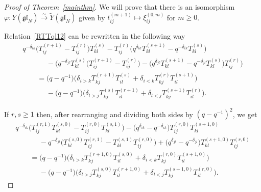\begin{proof}[Proof of Theorem~\ref{mainthm}] We will prove that there is an isomorphism $\varphi\colon Y(\mathfrak{gl}_N)
\stackrel{\sim}{\longrightarrow} \widetilde{Y}(\mathfrak{gl}_N)$ given by $t_{ij}^{(m+1)} \mapsto
\xi_{ij}^{(0,m)}$ for $m\ge 0$.

Relation~\eqref{RTTql12} can be rewritten in the following way
\begin{gather*}
q^{-\delta_{ik}}\big(T_{ij}^{(r+1)} - T_{ij}^{(r)}\big) T_{kl}^{(s)}- T_{ij}^{(r)} \big(q^{\delta_{ik}}T_{kl}^{(s+1)}
- q^{-\delta_{ik}}T_{kl}^{(s)}\big)
\\
\qquad\phantom{=}{}
- \big(q^{-\delta_{jl}}T_{kl}^{(s)} \big(T_{ij}^{(r+1)} - T_{ij}^{(r)}\big) - \big(q^{\delta_{jl}}T_{kl}^{(s+1)} -
q^{-\delta_{jl}}T_{kl}^{(s)}\big) T_{ij}^{(r)} \big)
\\
\qquad
= \big(q-q^{-1}\big) \big(\delta_{i>k}T_{kj}^{(r+1)} T_{il}^{(s)} + \delta_{i<k} T_{kj}^{(r)} T_{il}^{(s+1)}\big)
\\
\qquad\phantom{=}{}
  - \big(q-q^{-1}\big) \big(\delta_{l>j} T_{kj}^{(s)} T_{il}^{(r+1)} + \delta_{l<j} T_{kj}^{(s+1)} T_{il}^{(r)} \big).
\end{gather*}

If $r,s \geq 1$ then, after rearranging and dividing both sides by $(q-q^{-1})^2$, we get
\begin{gather*}
q^{-\delta_{ik}} \big(T_{ij}^{(r,1)} T_{kl}^{(s,0)}- T_{ij}^{(r,0)} T_{kl}^{(s,1)} \big) - \big(q^{\delta_{ik}} -
q^{-\delta_{ik}}\big) T_{ij}^{(r,0)} T_{kl}^{(s+1,0)}
\\
\qquad\phantom{=}{}
 - q^{-\delta_{jl}} \big(T_{kl}^{(s,0)} T_{ij}^{(r,1)} - T_{kl}^{(s,1)} T_{ij}^{(r,0)} \big) + \big(q^{\delta_{jl}} -
q^{-\delta_{jl}}\big) T_{kl}^{(s+1,0)} T_{ij}^{(r,0)}
\\
\qquad
= \big(q-q^{-1}\big) \big(  \delta_{i>k} T_{kj}^{(r+1,0)} T_{il}^{(s,0)} + \delta_{i<k} T_{kj}^{(r,0)} T_{il}^{(s+1,0)}\big)
\\
\qquad\phantom{=}{}
  - \big(q-q^{-1}\big) \big(\delta_{l>j} T_{kj}^{(s,0)} T_{il}^{(r+1,0)} + \delta_{l<j} T_{kj}^{(s+1,0)} T_{il}^{(r,0)} \big).
\end{gather*}


\end{proof}
